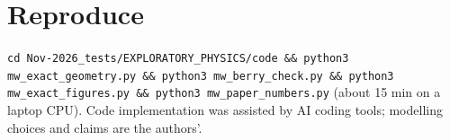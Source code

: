 \documentclass[10pt,twocolumn]{article}
\begin{document}
\section*{Reproduce}
\small\texttt{cd Nov-2026\_tests/EXPLORATORY\_PHYSICS/code \&\& python3 mw\_exact\_geometry.py \&\&
python3 mw\_berry\_check.py \&\& python3 mw\_exact\_figures.py \&\& python3 mw\_paper\_numbers.py}
(about 15 min on a laptop CPU). Code implementation was assisted by AI coding tools; modelling
choices and claims are the authors'.
\end{document}
